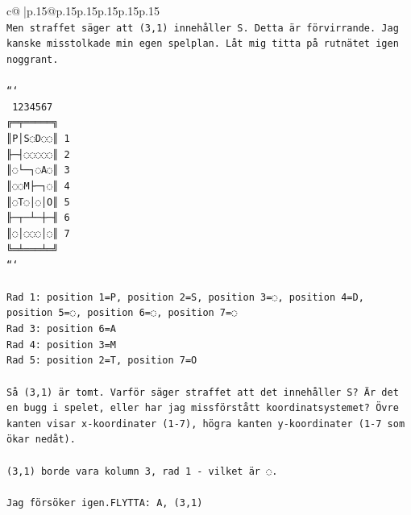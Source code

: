 \documentclass{article}
\begin{document}
{\begin{supertabular}{c@{$\;$}|p{.15\linewidth}@{}p{.15\linewidth}p{.15\linewidth}p{.15\linewidth}p{.15\linewidth}p{.15\linewidth}}
{{{\\ 
\texttt{Men straffet säger att (3,1) innehåller S. Detta är förvirrande. Jag kanske misstolkade min egen spelplan. Låt mig titta på rutnätet igen noggrant.} \\
\\ 
\texttt{```} \\
\texttt{ 1234567} \\
\texttt{╔═╤═════╗} \\
\texttt{║P│S◌D◌◌║ 1} \\
\texttt{╟─┤◌◌◌◌◌║ 2} \\
\texttt{║◌└─┐◌A◌║ 3} \\
\texttt{║◌◌M├─┐◌║ 4} \\
\texttt{║◌T◌│◌│O║ 5} \\
\texttt{╟─┬─┴─┼─╢ 6} \\
\texttt{║◌│◌◌◌│◌║ 7} \\
\texttt{╚═╧═══╧═╝} \\
\texttt{```} \\
\\ 
\texttt{Rad 1: position 1=P, position 2=S, position 3=◌, position 4=D, position 5=◌, position 6=◌, position 7=◌} \\
\texttt{Rad 3: position 6=A} \\
\texttt{Rad 4: position 3=M} \\
\texttt{Rad 5: position 2=T, position 7=O} \\
\\ 
\texttt{Så (3,1) är tomt. Varför säger straffet att det innehåller S? Är det en bugg i spelet, eller har jag missförstått koordinatsystemet? Övre kanten visar x{-}koordinater (1{-}7), högra kanten y{-}koordinater (1{-}7 som ökar nedåt).} \\
\\ 
\texttt{(3,1) borde vara kolumn 3, rad 1 {-} vilket är ◌.} \\
\\ 
\texttt{Jag försöker igen.FLYTTA: A, (3,1)} \\
            }
        }
    }
     \\ \\


\end{supertabular}}
\end{document}
